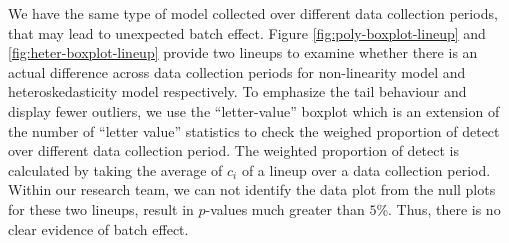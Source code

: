 \documentclass[]{interact}
\theoremstyle{plain}%
\theoremstyle{definition}
\theoremstyle{remark}
\begin{document}
We have the same type of model collected over different data collection
periods, that may lead to unexpected batch effect. Figure
\ref{fig:poly-boxplot-lineup} and \ref{fig:heter-boxplot-lineup} provide
two lineups to examine whether there is an actual difference across data
collection periods for non-linearity model and heteroskedasticity model
respectively. To emphasize the tail behaviour and display fewer
outliers, we use the ``letter-value'' boxplot \citep{hofmann2017value}
which is an extension of the number of ``letter value'' statistics to
check the weighed proportion of detect over different data collection
period. The weighted proportion of detect is calculated by taking the
average of \(c_i\) of a lineup over a data collection period. Within our
research team, we can not identify the data plot from the null plots for
these two lineups, result in \(p\)-values much greater than \(5\)\%.
Thus, there is no clear evidence of batch effect.



\end{document}
